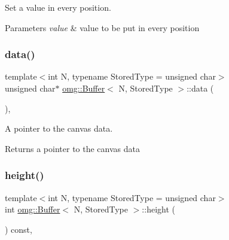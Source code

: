 Set a value in every position. 


\begin{DoxyParams}{Parameters}
{\em value} & value to be put in every position \\
\hline
\end{DoxyParams}
\mbox{\label{classomg_1_1_buffer_aa2ae2287b9e47f9e3a9f6fb6eb8cfb27}} 
\subsubsection{\texorpdfstring{data()}{data()}}
{\footnotesize\ttfamily template$<$int N, typename Stored\+Type = unsigned char$>$ \\
unsigned char$\ast$ \mbox{\hyperlink{classomg_1_1_buffer}{omg\+::\+Buffer}}$<$ N, Stored\+Type $>$\+::data (\begin{DoxyParamCaption}{ }\end{DoxyParamCaption})\hspace{0.3cm}{\ttfamily [inline]}, {\ttfamily [noexcept]}}



A pointer to the canvas data. 

\begin{DoxyReturn}{Returns}
a pointer to the canvas data 
\end{DoxyReturn}
\mbox{\label{classomg_1_1_buffer_aa6be8a001e33259c8c5c3e3f20eedbc9}} 
\subsubsection{\texorpdfstring{height()}{height()}}
{\footnotesize\ttfamily template$<$int N, typename Stored\+Type = unsigned char$>$ \\
int \mbox{\hyperlink{classomg_1_1_buffer}{omg\+::\+Buffer}}$<$ N, Stored\+Type $>$\+::height (\begin{DoxyParamCaption}{ }\end{DoxyParamCaption}) const\hspace{0.3cm}{\ttfamily [inline]}, {\ttfamily [noexcept]}}



